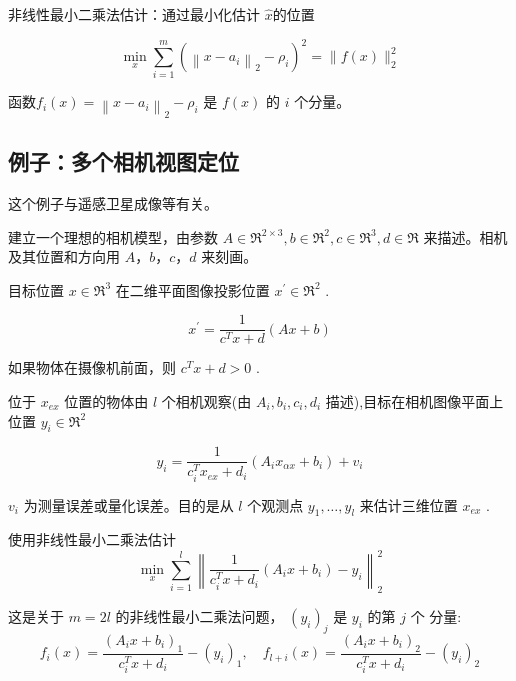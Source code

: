 非线性最小二乘法估计：通过最小化估计 $ \hat{x} $的位置

\begin{equation}
\min _{x} \sum_{i=1}^{m}\left(\left\|x-a_{i}\right\|_{2}-\rho_{i}\right)^{2}=\|f(x)\|_{2}^{2}
\end{equation}

函数$ f_{i}(x)=\left\|x-a_{i}\right\|_{2}-\rho_{i} $ 是 $ f(x) $ 的 $ i $ 个分量。


\subsection{例子：多个相机视图定位}

\begin{remark}
    这个例子与遥感卫星成像等有关。
\end{remark}

建立一个理想的相机模型，由参数 $ A \in \mathfrak{R}^{2 \times 3}, b \in \mathfrak{R}^{2}, c \in \mathfrak{R}^{3}, d \in \mathfrak{R} $ 来描述。相机及其位置和方向用 $ A ， b ， c ， d $ 来刻画。

目标位置 $ x \in \mathfrak{R}^{3} $ 在二维平面图像投影位置 $ x^{\prime} \in \mathfrak{R}^{2} $ .

\begin{equation}
x^{\prime}=\frac{1}{c^{T} x+d}(A x+b)
\end{equation}

如果物体在摄像机前面，则 $ c^{T} x+d>0 $ .

\begin{problem}
    位于 $ x_{e x} $ 位置的物体由 $ l $ 个相机观察(由 $ A_{i}, b_{i}, c_{i}, d_{i} $ 描述),目标在相机图像平面上位置 $ y_{i} \in \mathfrak{R}^{2} $

    \begin{equation}
    y_{i}=\frac{1}{c_{i}^{T} x_{e x}+d_{i}}\left(A_{i} x_{\alpha x}+b_{i}\right)+v_{i}
    \end{equation}

    $ v_{i} $ 为测量误差或量化误差。目的是从 $ l $ 个观测点 $ y_{1}, \ldots, y_{l} $ 来估计三维位置 $ x_{e x} $ .
\end{problem}


使用非线性最小二乘法估计
\begin{equation}
\min _{x} \sum_{i=1}^{l}\left\|\frac{1}{c_{i}^{T} x+d_{i}}\left(A_{i} x+b_{i}\right)-y_{i}\right\|_{2}^{2}
\end{equation}

这是关于 $ m=2 l $ 的非线性最小二乘法问题， $ \left(y_{i}\right)_{j} $ 是 $ y_{i} $ 的第 $ j $ 个 分量:
\begin{equation}
f_{i}(x)=\frac{\left(A_{i} x+b_{i}\right)_{1}}{c_{i}^{T} x+d_{i}}-\left(y_{i}\right)_{1}, \quad f_{l+i}(x)=\frac{\left(A_{i} x+b_{i}\right)_{2}}{c_{i}^{T} x+d_{i}}-\left(y_{i}\right)_{2}
\end{equation}

